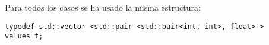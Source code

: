 Para todos los casos se ha usado la misma estructura:
\begin{lstlisting}
typedef std::vector <std::pair <std::pair<int, int>, float> > values_t;
\end{lstlisting}